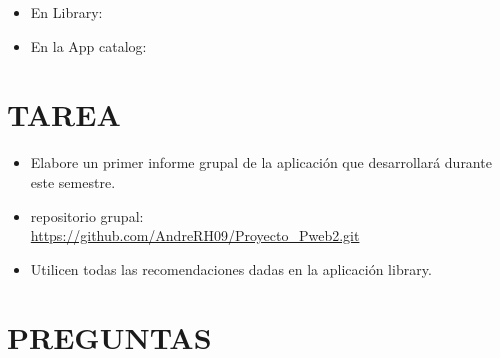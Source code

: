 \documentclass[12]{article}
\begin{document}
	\begin{itemize}
		
		\item En Library:
		
		
		
		\newpage
		\item En la App catalog:
		
		
		
		
		
		
	\end{itemize}
	
	
	\section{TAREA}
	\begin{itemize}
		\item Elabore un primer informe grupal de la aplicación que desarrollará durante este semestre. 
		\item repositorio grupal: \\
		\url{https://github.com/AndreRH09/Proyecto_Pweb2.git}
		\item Utilicen todas las recomendaciones dadas en la aplicación library.
	\end{itemize}
	
	\section{PREGUNTAS}
	
\end{document}
